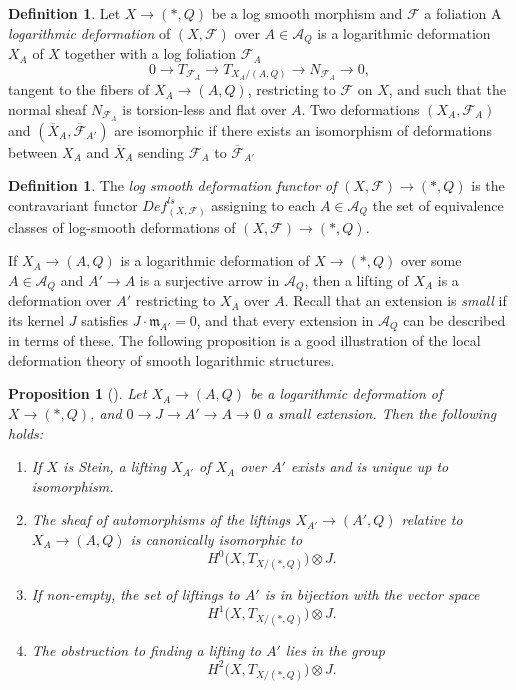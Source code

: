 \documentclass[reqno]{amsart}
\newcommand{\F}{\mathscr{F}}
\newtheorem{proposition}[theorem]{Proposition}
\theoremstyle{definition}
\newtheorem{definition}[theorem]{Definition}
\theoremstyle{named}
\begin{document}
\begin{definition} Let $X\to(\ast,Q)$ be a log smooth morphism and $\F$ a foliation
    A \textit{logarithmic deformation} of $(X,\F)$ over $A\in \mathcal A_Q$ is a logarithmic deformation $X_A$ of $X$ together with a log foliation $\F_A$
        \[
0\rightarrow T_{\F_A}\rightarrow T_{X_A/(A,Q)}\rightarrow N_{\F_A}\rightarrow 0,
\]
    tangent to the fibers of $X_A\to (A,Q)$, restricting to $\F$ on $X$, and such that the normal sheaf $N_{\F_A}$ is torsion-less and flat over $A$. Two deformations $(X_A,\F_A)$ and $(\overline{X}_A,\overline{\F}_{A'})$ are isomorphic if there exists an isomorphism of deformations between $X_A$ and $\overline{X}_A$ sending $\F_A$ to $\overline{\F}_{A'}$ 
\end{definition}

\begin{definition}
    The \emph{log smooth deformation functor of} $(X,\F)\to (\ast,Q)$ is the contravariant functor $Def^{ls}_{(X,\F)}$ assigning to each $A\in \mathcal A_Q$ the set of equivalence classes of log-smooth deformations of $(X,\F)\to(\ast,Q)$.
\end{definition}

If $X_A\to (A,Q)$ is a logarithmic deformation of $X\to (\ast, Q)$ over some $A\in \mathcal A_Q$ and $A'\to A$ is a surjective arrow in $\mathcal A_Q$, then a lifting of $X_A$ is a deformation over $A'$ restricting to $X_A$ over $A$. Recall that an extension is \emph{small} if its kernel $J$ satisfies $J\cdot\mathfrak m_{A'}=0$, and that every extension in $\mathcal A_Q$ can be described in terms of these.
The following proposition is a good illustration of the local deformation theory of smooth logarithmic structures.

\begin{proposition}[{{\cite[Proposition 3.14]{kato1988logarithmic_str}}}] \label{prop:logdefX}
    Let $X_A\to (A,Q)$ be a logarithmic  deformation of $X\to (\ast, Q)$, and $0\rightarrow J \rightarrow A'\to A\rightarrow 0$ a small extension. Then the following holds:
    \begin{enumerate}
        \item If $X$ is Stein, a lifting $X_{A'}$ of $X_A$ over $A'$ exists and is unique up to isomorphism.
        \item The sheaf of automorphisms of the liftings $X_{A'}\to (A',Q)$ relative to $X_A\to (A,Q)$ is canonically isomorphic to $$H^0\big(X,T_{X/(\ast,Q)}\big)\otimes J.$$
        \item If non-empty, the set of liftings to $A'$ is in bijection with the vector space $$H^1\big(X,T_{X/(\ast,Q)}\big)\otimes J.$$
        \item The obstruction to finding a lifting to $A'$ lies in the group $$H^2\big(X,T_{X/(\ast,Q)}\big)\otimes J.$$
    \end{enumerate}
\end{proposition}
\end{document}
